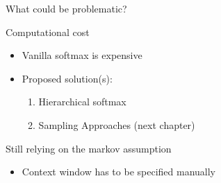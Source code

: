 \documentclass[11pt,compress,t,notes=noshow, xcolor=table]{beamer}
\begin{document}

\begin{frame}{What could be problematic?}

\vfill

\begin{block}{Computational cost}
    \begin{itemize}
        \item Vanilla softmax is expensive
        \item Proposed solution(s): 
        \begin{enumerate}
            \item Hierarchical softmax 
            \item Sampling Approaches (next chapter)
        \end{enumerate}
    \end{itemize}
\end{block}
\begin{block}{Still relying on the markov assumption}
    \begin{itemize}
        \item Context window has to be specified manually
    \end{itemize}
\end{block}

\vfill

\end{frame}


\endlecture
\end{document}
